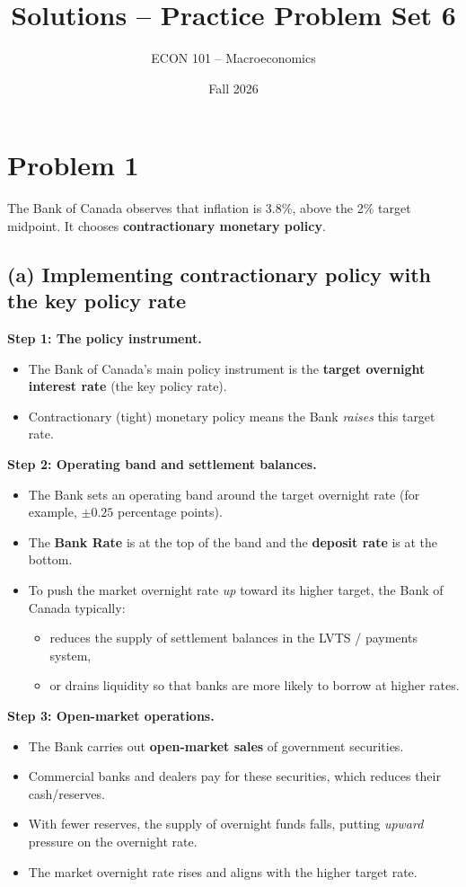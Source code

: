 \documentclass[12pt]{article}
\title{Solutions -- Practice Problem Set 6}
\author{ECON 101 -- Macroeconomics}
\date{Fall 2026}
\begin{document}
\maketitle

\section*{Problem 1}

The Bank of Canada observes that inflation is 3.8\%, above the 2\% target midpoint. It chooses \textbf{contractionary monetary policy}.

\subsection*{(a) Implementing contractionary policy with the key policy rate}

\textbf{Step 1: The policy instrument.}
\begin{itemize}
    \item The Bank of Canada's main policy instrument is the \textbf{target overnight interest rate} (the key policy rate).
    \item Contractionary (tight) monetary policy means the Bank \emph{raises} this target rate.
\end{itemize}

\textbf{Step 2: Operating band and settlement balances.}
\begin{itemize}
    \item The Bank sets an operating band around the target overnight rate (for example, $\pm 0.25$ percentage points).
    \item The \textbf{Bank Rate} is at the top of the band and the \textbf{deposit rate} is at the bottom.
    \item To push the market overnight rate \emph{up} toward its higher target, the Bank of Canada typically:
    \begin{itemize}
        \item reduces the supply of settlement balances in the LVTS / payments system,
        \item or drains liquidity so that banks are more likely to borrow at higher rates.
    \end{itemize}
\end{itemize}

\newpage
\textbf{Step 3: Open-market operations.}
\begin{itemize}
    \item The Bank carries out \textbf{open-market sales} of government securities.
    \item Commercial banks and dealers pay for these securities, which reduces their cash/reserves.
    \item With fewer reserves, the supply of overnight funds falls, putting \emph{upward} pressure on the overnight rate.
    \item The market overnight rate rises and aligns with the higher target rate.
\end{itemize}
\end{document}
